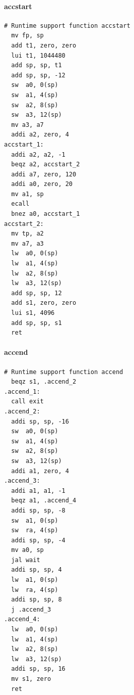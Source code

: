 \documentclass[a4paper]{exam}
\theoremstyle{definition}
\begin{document}
\hypertarget{accstart}{%
\paragraph{accstart}\label{accstart}}

\begin{verbatim}
# Runtime support function accstart
  mv fp, sp
  add t1, zero, zero
  lui t1, 1044480
  add sp, sp, t1
  add sp, sp, -12
  sw  a0, 0(sp)
  sw  a1, 4(sp)
  sw  a2, 8(sp)
  sw  a3, 12(sp)
  mv a3, a7
  addi a2, zero, 4
accstart_1:
  addi a2, a2, -1
  beqz a2, accstart_2
  addi a7, zero, 120
  addi a0, zero, 20
  mv a1, sp
  ecall
  bnez a0, accstart_1
accstart_2:
  mv tp, a2
  mv a7, a3
  lw  a0, 0(sp)
  lw  a1, 4(sp)
  lw  a2, 8(sp)
  lw  a3, 12(sp)
  add sp, sp, 12
  add s1, zero, zero
  lui s1, 4096
  add sp, sp, s1
  ret
\end{verbatim}
\hypertarget{accend}{%
\paragraph{accend}\label{accend}}
\begin{verbatim}
# Runtime support function accend
  beqz s1, .accend_2
.accend_1:
  call exit
.accend_2:
  addi sp, sp, -16
  sw  a0, 0(sp)
  sw  a1, 4(sp)
  sw  a2, 8(sp)
  sw  a3, 12(sp)
  addi a1, zero, 4
.accend_3:
  addi a1, a1, -1
  beqz a1, .accend_4
  addi sp, sp, -8
  sw  a1, 0(sp)
  sw  ra, 4(sp)
  addi sp, sp, -4
  mv a0, sp
  jal wait
  addi sp, sp, 4
  lw  a1, 0(sp)
  lw  ra, 4(sp)
  addi sp, sp, 8
  j .accend_3
.accend_4:
  lw  a0, 0(sp)
  lw  a1, 4(sp)
  lw  a2, 8(sp)
  lw  a3, 12(sp)
  addi sp, sp, 16
  mv s1, zero
  ret
\end{verbatim}
\printbibliography
\end{document}
